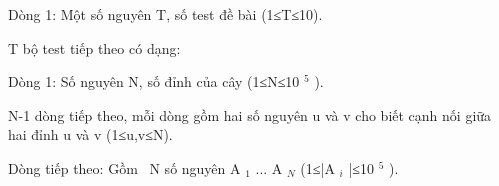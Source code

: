 Dòng 1: Một số nguyên T, số test đề bài (1≤T≤10).

T bộ test tiếp theo có dạng:

Dòng 1: Số nguyên N, số đỉnh của cây (1≤N≤10 $^ 5 $ ).

N-1 dòng tiếp theo, mỗi dòng gồm hai số nguyên u và v cho biết cạnh nối giữa hai đỉnh u và v (1≤u,v≤N).

Dòng tiếp theo: Gồm  N số nguyên A $_ 1 $ ... A $_ N $ (1≤|A $_ i $ |≤10 $^ 5 $ ).